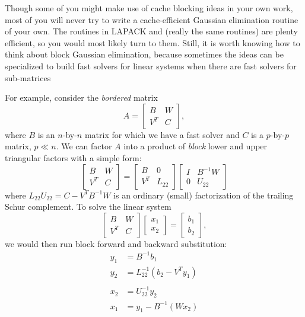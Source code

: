 \documentclass[12pt, leqno]{article}
\begin{document}
Though some of you might make use of cache blocking ideas in your own
work, most of you will never try to write a cache-efficient Gaussian
elimination routine of your own.  The routines in LAPACK and \matlab
(really the same routines) are plenty efficient, so you would most
likely turn to them.  Still, it is worth knowing how to think about
block Gaussian elimination, because sometimes the ideas can be specialized
to build fast solvers for linear systems when there are fast solvers for
sub-matrices

For example, consider the {\em bordered} matrix
\[
  A = \begin{bmatrix} B & W \\ V^T & C \end{bmatrix},
\]
where $B$ is an $n$-by-$n$ matrix for which we have a fast
solver and $C$ is a $p$-by-$p$ matrix, $p \ll n$.
We can factor $A$ into a product of {\em block} lower and
upper triangular factors with a simple form:
\[
  \begin{bmatrix} B & W \\ V^T & C \end{bmatrix} =
  \begin{bmatrix} B   & 0 \\ V^T & L_{22} \end{bmatrix}
  \begin{bmatrix} I & B^{-1} W \\ 0 & U_{22} \end{bmatrix}
\]
where $L_{22} U_{22} = C-V^T B^{-1} W$ is an ordinary (small) factorization
of the trailing Schur complement.  To solve the linear system
\[
  \begin{bmatrix} B & W \\ V^T & C \end{bmatrix}
  \begin{bmatrix} x_1 \\ x_2 \end{bmatrix} =
  \begin{bmatrix} b_1 \\ b_2 \end{bmatrix},
\]
we would then run block forward and backward substitution:
\begin{align*}
  y_1 &= B^{-1} b_1 \\
  y_2 &= L_{22}^{-1} \left( b_2 - V^T y_1 \right) \\
\\
  x_2 &= U_{22}^{-1} y_2 \\
  x_1 &= y_1-B^{-1} (W x_2)
\end{align*}
\end{document}
